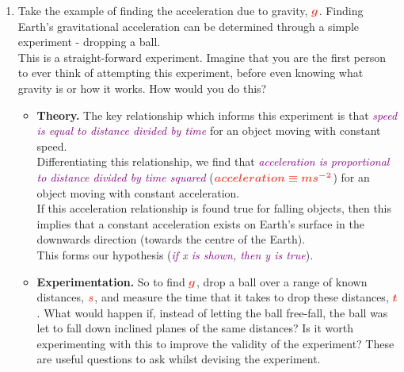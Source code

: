 \documentclass{article}
\begin{document}
    
    \begin{tcolorbox}[colback=white,colbacktitle=dblue!75!white,colframe=dblue!75!white,title=\textbf{Science is creative! Here is an example.}]
    
        \renewcommand{\theenumi}{\Alph{enumi}}
        \begin{enumerate}
            \item Take the example of finding the acceleration due to gravity, $ \textcolor{red}{\boldsymbol{g}} $. Finding Earth's gravitational acceleration can be determined through a simple experiment - dropping a ball.\\
            
            This is a straight-forward experiment. Imagine that you are the first person to ever think of attempting this experiment, before even knowing what gravity is or how it works. How would you do this?
            
            
            \begin{itemize}
                \item \textbf{Theory.} The key relationship which informs this experiment is that \emph{\textcolor{purple}{speed is equal to distance divided by time}} for an object moving with constant speed. \\
                
                Differentiating this relationship, we find that \emph{\textcolor{purple}{acceleration is proportional to distance divided by time squared}} ($ \textcolor{red}{\boldsymbol{acceleration \equiv ms^{-2}}} $) for an object moving with constant acceleration.\\
                
                If this acceleration relationship is found true for falling objects, then this implies that a constant acceleration exists on Earth's surface in the downwards direction (towards the centre of the Earth). \\
                
                This forms our hypothesis (\emph{\textcolor{purple}{if x is shown, then y is true}}).\\
                    
                    
                \item \textbf{Experimentation.} So to find $ \textcolor{red}{\boldsymbol{g}} $, drop a ball over a range of known distances, $ \textcolor{red}{\boldsymbol{s}} $, and measure the time that it takes to drop these distances, $ \textcolor{red}{\boldsymbol{t}} $. What would happen if, instead of letting the ball free-fall, the ball was let to fall down inclined planes of the same distances? Is it worth experimenting with this to improve the validity of the experiment? These are useful questions to ask whilst devising the experiment.\\
                

\end{itemize}
\end{enumerate}
\end{tcolorbox}
\end{document}
